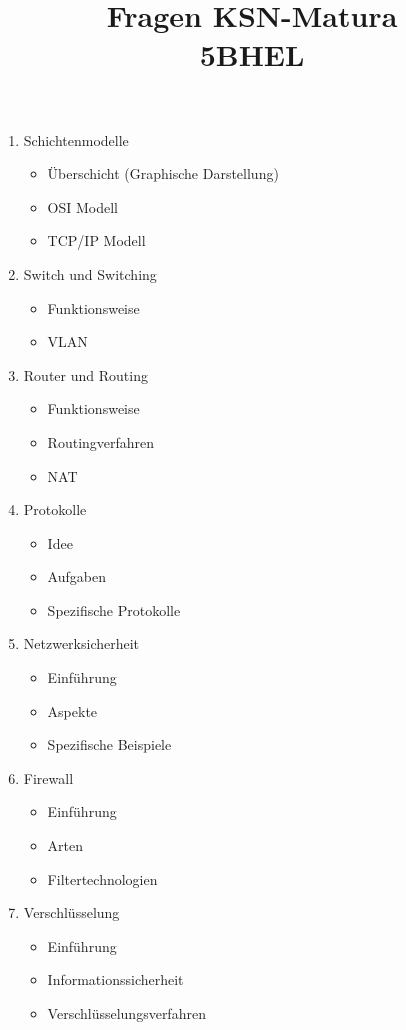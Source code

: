 \documentclass[a4paper]{report}
\title{Fragen KSN-Matura \\5BHEL}
\begin{document}
\maketitle
\begin{enumerate}
\item Schichtenmodelle
\begin{itemize}
\item Überschicht (Graphische Darstellung)
\item OSI Modell
\item TCP/IP Modell
\end{itemize}

\item Switch und Switching
\begin{itemize}
\item Funktionsweise
\item VLAN
\end{itemize}

\item Router und Routing
\begin{itemize}
\item Funktionsweise
\item Routingverfahren
\item NAT
\end{itemize}

\item Protokolle
\begin{itemize}
\item Idee
\item Aufgaben
\item Spezifische Protokolle
\end{itemize}

\item Netzwerksicherheit
\begin{itemize}
\item Einführung
\item Aspekte
\item Spezifische Beispiele
\end{itemize}

\item Firewall
\begin{itemize}
\item Einführung
\item Arten
\item Filtertechnologien
\end{itemize}

\item Verschlüsselung
\begin{itemize}
\item Einführung
\item Informationssicherheit
\item Verschlüsselungsverfahren
\end{itemize}


\end{enumerate}
\end{document}
